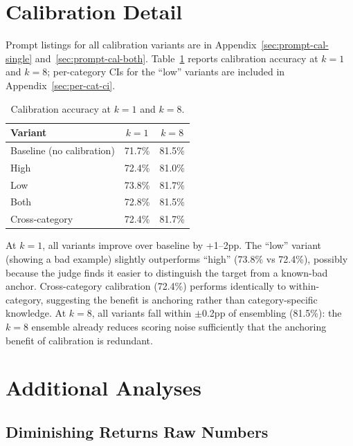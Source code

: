 \documentclass{article}
\begin{document}
\section{Calibration Detail}
\label{sec:calibration-detail}

Prompt listings for all calibration variants are in Appendix~\ref{sec:prompt-cal-single} and~\ref{sec:prompt-cal-both}. Table~\ref{tab:cal-results} reports calibration accuracy at $k{=}1$ and $k{=}8$; per-category CIs for the ``low'' variants are included in Appendix~\ref{sec:per-cat-ci}.

\begin{table}[ht]
\centering
\caption{Calibration accuracy at $k{=}1$ and $k{=}8$.}
\label{tab:cal-results}
\begin{tabular}{lcc}
\toprule
Variant & $k{=}1$ & $k{=}8$ \\
\midrule
Baseline (no calibration) & 71.7\% & 81.5\% \\
High           & 72.4\% & 81.0\% \\
Low            & 73.8\% & 81.7\% \\
Both           & 72.8\% & 81.5\% \\
Cross-category & 72.4\% & 81.7\% \\
\bottomrule
\end{tabular}
\end{table}

At $k{=}1$, all variants improve over baseline by +1--2pp. The ``low'' variant (showing a bad example) slightly outperforms ``high'' (73.8\% vs 72.4\%), possibly because the judge finds it easier to distinguish the target from a known-bad anchor. Cross-category calibration (72.4\%) performs identically to within-category, suggesting the benefit is anchoring rather than category-specific knowledge. At $k{=}8$, all variants fall within $\pm$0.2pp of ensembling (81.5\%): the $k{=}8$ ensemble already reduces scoring noise sufficiently that the anchoring benefit of calibration is redundant.

\section{Additional Analyses}
\label{sec:additional-analyses}

\subsection{Diminishing Returns Raw Numbers}
\end{document}
